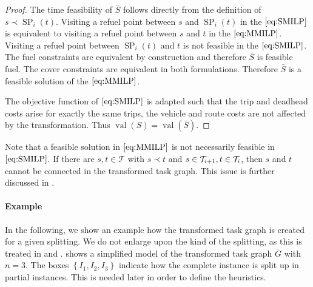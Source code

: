 \begin{proof}
The time feasibility of $\bar{S}$ follows directly from the definition of ${s\prec\operatorname{SP}_i(t)}$. Visiting a refuel point between $s$ and $\operatorname{SP}_i(t)$ in the $\eqref{eq:SMILP}$ is equivalent to visiting a refuel point between $s$ and $t$ in the $\eqref{eq:MMILP}$. Visiting a refuel point between $\operatorname{SP}_i(t)$ and $t$ is not feasible in the $\eqref{eq:SMILP}$. The fuel constraints are equivalent by construction and therefore $\bar{S}$ is feasible \wrt fuel. The cover constraints are equivalent in both formulations. Therefore $\bar{S}$ is a feasible solution of the $\eqref{eq:MMILP}$.

The objective function of $\eqref{eq:SMILP}$ is adapted such that the trip and deadhead costs arise for exactly the same trips, the vehicle and route costs are not affected by the transformation. Thus ${\operatorname{val}(S)=\operatorname{val}(\bar{S})}$.
%
\end{proof}

\begin{remark}

Note that a feasible solution in $\eqref{eq:MMILP}$ is not necessarily feasible in $\eqref{eq:SMILP}$. If there are ${s,t\in\mathcal{T}}$ with ${s\prec t}$ and ${s\in\mathcal{T}_{i+1}}, {t\in\mathcal{T}_i}$, then $s$ and $t$ cannot be connected in the transformed task graph. This issue is further discussed in .

\end{remark}

\paragraph{Example} \parfill

In the following, we show an example how the transformed task graph is created for a given splitting. We do not enlarge upon the kind of the splitting, as this is treated in  and .  shows a simplified model of the transformed task graph $\overline{G}$ with $n=3$. The boxes $\left\{I_1,I_2,I_3\right\}$ indicate how the complete instance is split up in partial instances. This is needed later in order to define the heuristics.

